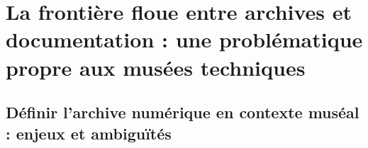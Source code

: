 \section{La frontière floue entre archives et documentation : une problématique propre aux musées techniques}

\subsection{Définir l’archive numérique en contexte muséal : enjeux et ambiguïtés}


